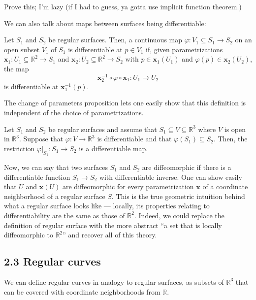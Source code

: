 \documentclass[10pt]{scrartcl}
\providecommand{\RR}{\mathbb R}
\providecommand{\inv}{^{-1}}
\providecommand{\mb}[1]{\mathbf{#1}}
\begin{document}
\begin{exercise}
	Prove this; I'm lazy
	(if I had to guess, ya gotta use implicit function theorem.)
\end{exercise}

We can also talk about maps between surfaces being differentiable:
\begin{definition}
	Let $S_1$ and $S_2$ be regular surfaces.
	Then, a continuous map $\varphi\colon V_1\subseteq S_1\to S_2$
	on an open subset $V_1$ of $S_1$ is differentiable at $p\in V_1$
	if, given parametrizations $\mb x_1\colon U_1\subseteq\RR^2\to S_1$
	and $\mb x_2\colon U_2\subseteq\RR^2\to S_2$ with $p\in\mb x_1(U_1)$ and
	$\varphi(p)\in\mb x_2(U_2)$, the map
	\[\mb x_2\inv\circ\varphi\circ\mb x_1\colon U_1\to U_2\]
	is differentiable at $\mb x_1\inv(p)$.
\end{definition}

The change of parameters proposition lets one easily show
that this definition is independent of the choice of parametrizations.

\begin{exercise}
	Let $S_1$ and $S_2$ be regular surfaces
	and assume that $S_1\subseteq V\subseteq\RR^3$
	where $V$ is open in $\RR^3$.
	Suppose that $\varphi\colon V\to\RR^3$ is differentiable
	and that $\varphi(S_1)\subseteq S_2$.
	Then, the restriction $\varphi|_{S_1}\colon S_1\to S_2$
	is a differentiable map.
\end{exercise}

Now, we can say that two surfaces $S_1$ and $S_2$ are
diffeomorphic if there is a differentiable function $S_1\to S_2$
with differentiable inverse.
One can show easily that $U$ and $\mb x(U)$ are diffeomorphic
for every parametrization $\mb x$ of a coordinate neighborhood
of a regular surface $S$. This is the true geometric intuition
behind what a regular surface looks like --- locally, its properties
relating to differentiability are the same as those of $\RR^2$.
Indeed, we could replace the definition of regular surface
with the more abstract ``a set that is locally diffeomorphic to $\RR^2$''
and recover all of this theory.

\subsection{2.3 Regular curves}
We can define regular curves in analogy to regular surfaces,
as subsets of $\RR^3$ that can be covered with coordinate neighborhoods
from $\RR$.
\end{document}
